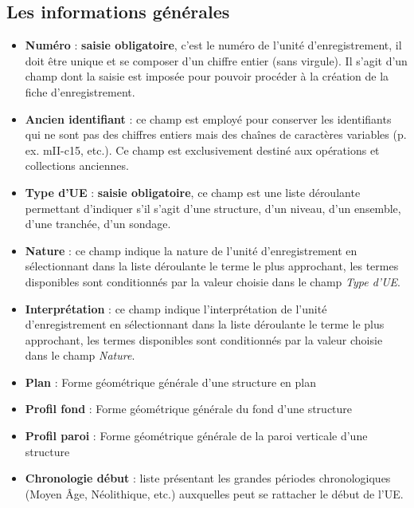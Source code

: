 \documentclass[letterpaper,10pt,french]{sphinxmanual}
\begin{document}
\subsection{Les informations générales}
\label{manuel/formulaire_ue:les-informations-generales}\begin{itemize}
\item {} 
\textbf{Numéro} : \textbf{saisie obligatoire}, c'est le numéro de l'unité d'enregistrement, il doit être unique et se composer d'un chiffre entier (sans virgule). Il s'agit d'un champ dont la saisie est imposée pour pouvoir procéder à la création de la fiche d'enregistrement.

\item {} 
\textbf{Ancien identifiant} : ce champ est employé pour conserver les identifiants qui ne sont pas des chiffres entiers mais des chaînes de caractères variables (p. ex. mII-c15, etc.). Ce champ est exclusivement destiné aux opérations et collections anciennes.

\item {} 
\textbf{Type d'UE} : \textbf{saisie obligatoire}, ce champ est une liste déroulante permettant d'indiquer s'il s'agit d'une structure, d'un niveau, d'un ensemble, d'une tranchée, d'un sondage.

\item {} 
\textbf{Nature} : ce champ indique la nature de l'unité d'enregistrement en sélectionnant dans la liste déroulante le terme le plus approchant, les termes disponibles sont conditionnés par la valeur choisie dans le champ \emph{Type d'UE}.

\item {} 
\textbf{Interprétation} : ce champ indique l'interprétation de l'unité d'enregistrement en sélectionnant dans la liste déroulante le terme le plus approchant, les termes disponibles sont conditionnés par la valeur choisie dans le champ \emph{Nature}.

\item {} 
\textbf{Plan} : Forme géométrique générale d'une structure en plan

\item {} 
\textbf{Profil fond} : Forme géométrique générale du fond d'une structure

\item {} 
\textbf{Profil paroi} : Forme géométrique générale de la paroi verticale d'une structure

\item {} 
\textbf{Chronologie début} : liste présentant les grandes périodes chronologiques (Moyen Âge, Néolithique, etc.) auxquelles peut se rattacher le début de l'UE.


\end{itemize}
\end{document}
